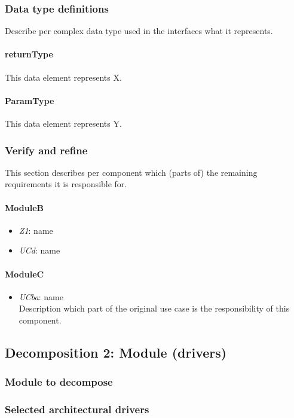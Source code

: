 \documentclass[a4paper,10pt]{article}
\begin{document}
\subsubsection{Data type definitions}
Describe per complex data type used in the interfaces what it represents.

\paragraph{returnType} This data element represents X.

\paragraph{ParamType} This data element represents Y.

\subsubsection{Verify and refine}
This section describes per component which (parts of) the remaining
requirements it is responsible for.

\paragraph{ModuleB}
\begin{itemize}
    \item \emph{Z1}: name
    \item \emph{UCd}: name
\end{itemize}

\paragraph{ModuleC}
\begin{itemize}
    \item \emph{UCba}: name\\Description which part of the original use case is
        the responsibility of this component.
\end{itemize}

\subsection{Decomposition 2: Module (drivers)}
\subsubsection{Module to decompose}
\subsubsection{Selected architectural drivers}
\end{document}
